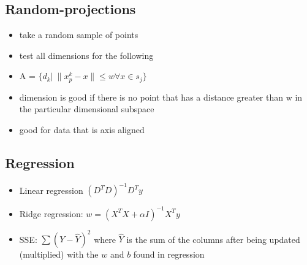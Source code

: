 \documentclass[11pt]{article}
\begin{document}
\subsection*{Random-projections}
\label{sec:orgcdd7116}
\begin{itemize}
\item take a random sample of points
\item test all dimensions for the following
\item A = \(\{d_k| \: \|x_p^k - x\| \le w \forall x \in s_j\}\)
\item dimension is good if there is no point that has a distance greater than w in
the particular dimensional subspace
\item good for data that is axis aligned
\end{itemize}
\subsection*{Regression}
\label{sec:org7656828}
\begin{itemize}
\item Linear regression \((D^TD)^{-1}D^Ty\)
\item Ridge regression:  \(w = (X^TX + \alpha I)^{-1}X^Ty\)
\item SSE: \(\sum(Y-\hat Y)^2\) where \(\hat Y\) is the sum of the columns after being
updated (multiplied) with the \(w\) and \(b\) found in regression
\end{itemize}
\end{document}
